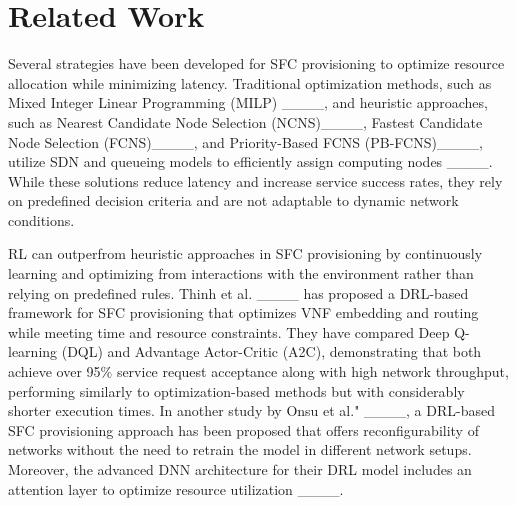 \section{Related Work}
Several strategies have been developed for SFC provisioning to optimize resource allocation while minimizing latency. Traditional optimization methods, such as Mixed Integer Linear Programming (MILP) ____, and heuristic approaches, such as Nearest Candidate Node Selection (NCNS)____, Fastest Candidate Node Selection (FCNS)____, and Priority-Based FCNS (PB-FCNS)____, utilize SDN and queueing models to efficiently assign computing nodes ____. While these solutions reduce latency and increase service success rates, they rely on predefined decision criteria and are not adaptable to dynamic network conditions. 

RL can outperfrom heuristic approaches in SFC provisioning by continuously learning and optimizing from interactions with the environment rather than relying on predefined rules.
Thinh et al. ____ has proposed a DRL-based framework for SFC provisioning that optimizes VNF embedding and routing while meeting time and resource constraints. They have compared Deep Q-learning (DQL) and Advantage Actor-Critic (A2C), demonstrating that both achieve over 95\% service request acceptance along with high network throughput, performing similarly to optimization-based methods but with considerably shorter execution times. 
In another study  by Onsu et al." ____, a DRL-based SFC provisioning approach has been proposed that offers reconfigurability of networks without the need to retrain the model in different network setups. Moreover, the advanced DNN architecture for their DRL model includes an attention layer to optimize resource utilization ____. 


